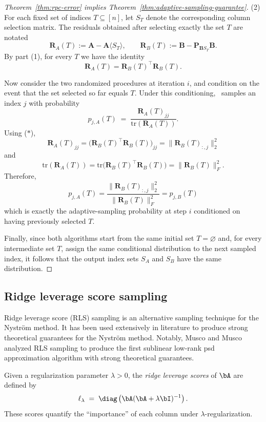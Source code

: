 \begin{proof}[Theorem~\ref{thm:rpc-error} implies Theorem~\ref{thm:adaptive-sampling-guarantee}]
\vspace{1em}
\noindent
(2) For each fixed set of indices $T \subseteq [n]$, let $S_T$ denote the corresponding column selection matrix.
The residuals obtained after selecting exactly the set $T$ are notated
\[
\mathbf{R}_A(T) := \mathbf{A}-\mathbf{A}\langle S_T\rangle,
\qquad
\mathbf{R}_B(T) := \mathbf{B}-\mathbf{P}_{\mathbf{B}S_T}\mathbf{B}.
\]
By part (1), for every $T$ we have the identity
\[
\mathbf{R}_A(T) = \mathbf{R}_B(T)^\top \mathbf{R}_B(T).\tag{$\ast$}
\]

Now consider the two randomized procedures at iteration $i$, and condition on the event that the set selected so far equals $T$.
Under this conditioning, \RPCholesky\ samples an index $j$ with probability
\[
p_{j,A}(T) \;=\; \frac{\mathbf{R}_A(T)_{jj}}{\mathrm{tr}(\mathbf{R}_A(T))}.
\]
Using ($\ast$),
\[
\mathbf{R}_A(T)_{jj}
= \big(\mathbf{R}_B(T)^\top \mathbf{R}_B(T)\big)_{jj}
= \|\mathbf{R}_B(T)_{:,j}\|_2^2
\]
and
\[
\mathrm{tr}(\mathbf{R}_A(T))
= \mathrm{tr}\big(\mathbf{R}_B(T)^\top \mathbf{R}_B(T)\big)
= \|\mathbf{R}_B(T)\|_F^2.
\]
Therefore,
\[
p_{j,A}(T)
=\frac{\|\mathbf{R}_B(T)_{:,j}\|_2^2}{\|\mathbf{R}_B(T)\|_F^2}
= p_{j,B}(T)
\]
which is exactly the adaptive-sampling probability at step $i$ conditioned on having previously selected $T$.

Finally, since both algorithms start from the same initial set $T=\varnothing$ and, for every intermediate set $T$, assign the same conditional distribution to the next sampled index, it follows that the output index sets $S_A$ and $S_B$ have the same distribution.
\end{proof}

\subsection{Ridge leverage score sampling}

Ridge leverage score (RLS) sampling is an alternative sampling technique for the Nystr\"om method. It has been used extensively in literature to produce strong theoretical guarantees for the Nystr\"om method. Notably, Musco and Musco \cite{musco_recursive_2017} analyzed RLS sampling to produce the first sublinear low-rank psd approximation algorithm with strong theoretical guarantees.

Given a regularization parameter $\lambda>0$, the \emph{ridge leverage scores} of $\bA$
are defined by
\[
\ell_\lambda \;=\; \diag\left(\bA(\bA +\lambda \bI)^{-1}\right).
\]
These scores quantify the “importance” of each column under $\lambda$-regularization. 

